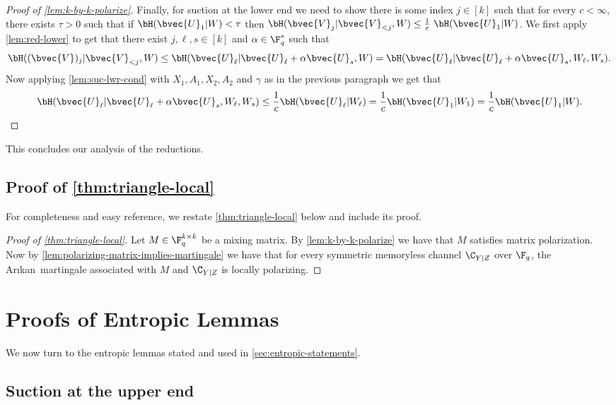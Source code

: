 \documentclass[11pt]{article}
\newcommand{\Arikan}{Ar\i kan}
\begin{document}
\begin{proof}[Proof of \cref{lem:k-by-k-polarize}]
	Finally, for suction at the lower end we need to show there is some index $j \in [k]$ such that for every $c < \infty$, there  exists $\tau > 0$ such that if
	$\bH(\bvec{U}_1 | W) < \tau$ then $\bH(\bvec{V}_j | \bvec{V}_{< j}, W)  \leq \frac{1}{c}~\bH(\bvec{U}_1 | W)$. We first apply \cref{lem:red-lower} to get that there exist
    $j,\ell,s\in[k]$ and $\alpha \in \F_q^*$ such that 
    $$
	\bH((\bvec{V})_j | \bvec{V}_{< j}, W)  \leq \bH(\bvec{U}_\ell | \bvec{U}_\ell + \alpha\bvec{U}_s , W) =\bH(\bvec{U}_\ell | \bvec{U}_\ell + \alpha\bvec{U}_s,  W_\ell,W_s).$$
	Now applying \cref{lem:suc-lwr-cond} with $X_1,A_1,X_2,A_2$ and $\gamma$ as in the previous paragraph we get that 
	$$\bH(\bvec{U}_\ell | \bvec{U}_\ell + \alpha\bvec{U}_s,  W_\ell,W_s) \leq \frac1c \bH(\bvec{U}_\ell | W_\ell) = \frac1c \bH(\bvec{U}_1 | W_1) = \frac1c \bH(\bvec{U}_1 | W).$$
\end{proof}


This concludes our analysis of the reductions.

\subsection{Proof of \cref{thm:triangle-local}}
\label{subsec:thm-1.14}
For completeness and easy reference, we restate \cref{thm:triangle-local} below and include its proof.

\thmtrianglelocal*


\begin{proof}[Proof of \cref{thm:triangle-local}]
	Let $M\in \F_q^{k \times k}$ be a mixing matrix. By \cref{lem:k-by-k-polarize} we have that $M$ satisfies matrix polarization. Now by   \cref{lem:polarizing-matrix-implies-martingale} we have that 
	for every symmetric memoryless channel
	$\C_{Y|Z}$ over $\F_q$, the \Arikan\ martingale associated with $M$ and $\C_{Y|Z}$ is locally polarizing.
\end{proof}


\section{Proofs of Entropic Lemmas}
\label{sec:entropic-proofs}
We now turn to the entropic lemmas stated and used  in \cref{sec:entropic-statements}.

\subsection{Suction at the upper end}
\end{document}
